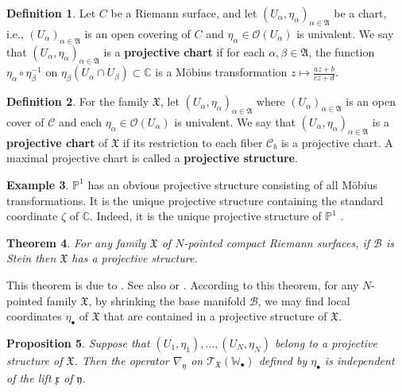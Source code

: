 \documentclass[12pt,a4paper,notitlepage]{article}
\theoremstyle{definition}
\newtheorem{df}{Definition}[section]
\newtheorem{eg}[df]{Example}
\theoremstyle{plain}
\newtheorem{thm}[df]{Theorem}
\newtheorem{pp}[df]{Proposition}
\newcommand{\fk}{\mathfrak}
\newcommand{\mc}{\mathcal}
\newcommand{\scr}{\mathscr}
\newcommand{\xk}{\mathfrak x}
\newcommand{\yk}{\mathfrak y}
\newcommand{\blt}{\bullet}
\newcommand{\Wbb}{\mathbb W}
\newcommand{\Cbb}{\mathbb C}
\newcommand{\Pbb}{\mathbb P}
\numberwithin{equation}{section}
\begin{document}
\begin{df}
Let $C$ be a Riemann surface, and let $(U_{\alpha},\eta_\alpha)_{\alpha\in\fk A}$ be a chart, i.e., $(U_\alpha)_{\alpha\in\fk A}$ is an open covering of $C$ and $\eta_\alpha\in\scr O(U_\alpha)$ is univalent. We say that $(U_{\alpha},\eta_\alpha)_{\alpha\in\fk A}$ is a \textbf{projective chart}  if for each $\alpha,\beta\in\fk A$, the function $\eta_\alpha\circ\eta_\beta^{-1}$ on $\eta_\beta(U_\alpha\cap U_\beta)\subset\Cbb$ is a M\"obius transformation $z\mapsto \frac{az+b}{cz+d}$.
\end{df}










\begin{df}
For the family $\fk X$, let $(U_{\alpha},\eta_\alpha)_{\alpha\in\fk A}$ where $(U_\alpha)_{\alpha\in\fk A}$ is an open cover of $\mc C$ and each $\eta_\alpha\in\scr O(U_\alpha)$ is univalent. We say that  $(U_{\alpha},\eta_\alpha)_{\alpha\in\fk A}$ is a \textbf{projective chart} of $\fk X$ if its restriction to each fiber $\mc C_b$ is a projective chart. A maximal projective chart is called a \textbf{projective structure}.
\end{df}



\begin{eg}
$\Pbb^1$ has an obvious projective structure consisting of all M\"obius transformations. It is the unique projective structure containing the standard coordinate $\zeta$ of $\Cbb$. Indeed, it is the unique projective structure of $\Pbb^1$ \cite[8.2.12]{FB04}.
\end{eg}

\begin{thm}
For any family $\fk X$ of $N$-pointed compact Riemann surfaces, if $\mc B$ is Stein then $\fk X$ has a projective structure.
\end{thm}
This theorem is due to \cite{Hub80}. See also \cite[Sec. 4.1]{Gui} or \cite[Sec. B]{Gui}. According to this theorem, for any $N$-pointed family $\fk X$, by shrinking the base manifold $\mc B$, we may find local coordinates $\eta_\blt$ of $\fk X$ that are contained in a projective structure of $\fk X$.




\begin{pp}\label{lb151}
Suppose that $(U_1,\eta_1),\dots,(U_N,\eta_N)$ belong to a projective structure of $\fk X$. Then the operator $\nabla_\yk$ on $\scr T_{\fk X}(\Wbb_\blt)$ defined by $\eta_\blt$ is independent of the lift $\xk$ of $\yk$.
\end{pp}
\end{document}
